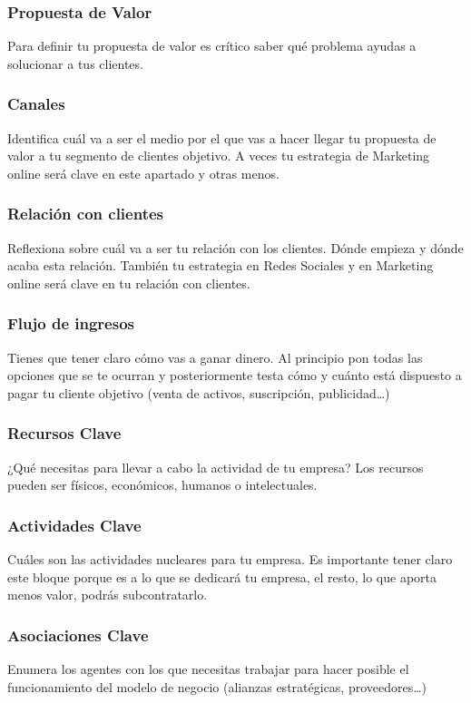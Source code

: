 \documentclass[10pt,a4paper]{article}
\begin{document}
				\subsubsection{Propuesta de Valor}				
				Para definir tu propuesta de valor es crítico saber qué problema ayudas a solucionar a tus clientes. 
				
				\subsubsection{Canales}				
				Identifica cuál va a ser el medio por el que vas a hacer llegar tu propuesta de valor a tu segmento de clientes objetivo. A veces tu estrategia de Marketing online será clave en este apartado y otras menos. 
				
				\subsubsection{Relación con clientes}
				Reflexiona sobre cuál va a ser tu relación con los clientes. Dónde empieza y dónde acaba esta relación. También tu estrategia en Redes Sociales y en Marketing online será clave en tu relación con clientes. 
				
				\subsubsection{Flujo de ingresos}
				Tienes que tener claro cómo vas a ganar dinero. Al principio pon todas las opciones que se te ocurran y posteriormente testa cómo y cuánto está dispuesto a pagar tu cliente objetivo (venta de activos, suscripción, publicidad…)
				
				\subsubsection{Recursos Clave}
				¿Qué necesitas para llevar a cabo la actividad de tu empresa? Los recursos pueden ser físicos, económicos, humanos o intelectuales. 
				
				\subsubsection{Actividades Clave}
				Cuáles son las actividades nucleares para tu empresa. Es importante tener claro este bloque porque es a lo que se dedicará tu empresa, el resto, lo que aporta menos valor, podrás subcontratarlo. 
				
				\subsubsection{Asociaciones Clave}
				Enumera los agentes con los que necesitas trabajar para hacer posible el funcionamiento del modelo de negocio (alianzas estratégicas, proveedores…) 
				
				
			
\end{document}
